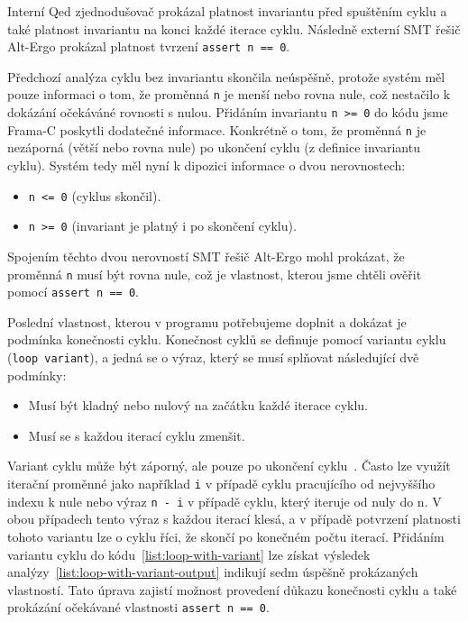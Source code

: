 Interní Qed zjednodušovač prokázal platnost invariantu před spuštěním cyklu a také platnost invariantu na konci každé iterace cyklu.
Následně externí SMT řešič Alt-Ergo prokázal platnost tvrzení \texttt{assert n == 0}.

Předchozí analýza cyklu bez invariantu skončila neúspěšně,
protože systém měl pouze informaci o tom, že proměnná \texttt{n} je menší nebo rovna nule,
což nestačilo k dokázání očekáváné rovnosti s nulou.
Přidáním invariantu \texttt{n >= 0} do kódu jsme Frama\mbox{-}C poskytli dodatečné informace.
Konkrétně o tom, že proměnná \texttt{n} je nezáporná (větší nebo rovna nule) po ukončení cyklu (z definice invariantu cyklu).
Systém tedy měl nyní k dipozici informace o dvou nerovnostech:

\begin{itemize}
    \item \texttt{n <= 0} (cyklus skončil).
    \item \texttt{n >= 0} (invariant je platný i po skončení cyklu).
\end{itemize}

Spojením těchto dvou nerovností SMT řešič Alt-Ergo mohl prokázat,
že proměnná \texttt{n} musí být rovna nule,
což je vlastnost, kterou jsme chtěli ověřit pomocí \texttt{assert n == 0}.

Poslední vlastnost, kterou v programu potřebujeme doplnit a dokázat je podmínka konečnosti cyklu.
Konečnost cyklů se definuje pomocí variantu cyklu (\texttt{loop variant}),
a jedná se o výraz, který se musí splňovat následující dvě podmínky:

\begin{itemize}
    \item Musí být kladný nebo nulový na začátku každé iterace cyklu.
    \item Musí se s každou iterací cyklu zmenšit.
\end{itemize}

Variant cyklu může být záporný, ale pouze po ukončení cyklu~\cite{ACSLSpec}.
Často lze využít iterační proměnné jako například \texttt{i} v případě cyklu pracujícího od nejvyššího indexu k nule
nebo výraz \texttt{n - i} v případě cyklu, který iteruje od nuly do n.
V obou případech tento výraz s každou iterací klesá,
a v případě potvrzení platnosti tohoto variantu lze o cyklu říci,
že skončí po konečném počtu iterací.
Přidáním variantu cyklu do kódu~\ref{list:loop-with-variant}
lze získat výsledek analýzy~\ref{list:loop-with-variant-output} indikují sedm úspěšně prokázaných vlastností.
Tato úprava zajistí možnost provedení důkazu konečnosti cyklu
a také prokázání očekávané vlastnosti \texttt{assert n == 0}.

